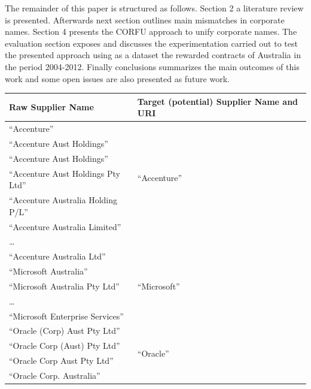 \documentclass{llncs}
\begin{document}
The remainder of this paper is structured as follows. Section 2 a literature review is presented. Afterwards next section outlines main mismatches in corporate names. Section 4 presents 
the CORFU approach to unify corporate names. The evaluation section exposes and discusses the experimentation carried out to test the presented approach using as a dataset the rewarded 
contracts of Australia in the period 2004-2012. Finally conclusions summarizes the main outcomes of this work 
and some open issues are also presented as future work.

\begin{table}[!htb]
\renewcommand{\arraystretch}{1.3}
\begin{center}
\begin{tabular}{|p{7cm}|p{7cm}|}
\hline
  \textbf{Raw Supplier Name} & \textbf{Target (potential) Supplier Name and URI}  \\  \hline
  ``Accenture'' & \multirow{6}{*}{``Accenture''} \\
  ``Accenture Aust Holdings'' & \multirow{6}{*}{\scriptsize\url{http://live.dbpedia.org/resource/Accenture}} \\ 
   ``Accenture Aust Holdings'' & \\  
   ``Accenture Aust Holdings Pty Ltd'' & \\
   ``Accenture  Australia Holding P/L'' & \\
  ``Accenture Australia Limited'' & \\
  \ldots  & \\
  ``Accenture Australia Ltd'' & \\ \hline
  ``Microsoft Australia'' & \multirow{3}{*}{``Microsoft''} \\
  ``Microsoft Australia Pty Ltd'' & \multirow{3}{*}{\scriptsize\url{http://live.dbpedia.org/resource/Microsoft}} \\
  \ldots  & \\
  ``Microsoft Enterprise Services'' & \\ \hline
  ``Oracle (Corp) Aust Pty Ltd''  & \multirow{10}{*}{``Oracle''} \\
  ``Oracle Corp (Aust) Pty Ltd''  & \multirow{10}{*}{\scriptsize\url{http://live.dbpedia.org/resource/Oracle_Corporation}} \\
  ``Oracle Corp Aust Pty Ltd'' & \\
   ``Oracle Corp. Australia'' & \\

\end{tabular}
\end{center}
\end{table}
\end{document}
